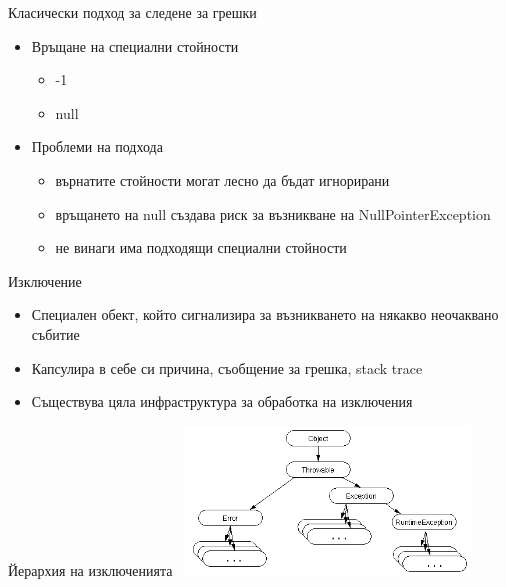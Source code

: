 \documentclass{beamer}
\begin{document}
\begin{frame}{Класически подход за следене за грешки}
  \transdissolve
  \begin{itemize}
  \item Връщане на специални стойности
    \begin{itemize}
      \item -1
      \item null
    \end{itemize}
  \item Проблеми на подхода
    \begin{itemize}
      \item върнатите стойности могат лесно да бъдат игнорирани
      \item връщането на null създава риск за възникване на
        NullPointerException
      \item не винаги има подходящи специални стойности
    \end{itemize}

  \end{itemize}
\end{frame}

\begin{frame}{Изключение}
  \transdissolve
  \begin{itemize}
  \item Специален обект, който сигнализира за възникването на някакво
    неочаквано събитие
  \item Капсулира в себе си причина, съобщение за грешка, stack trace
  \item Съществува цяла инфраструктура за обработка на изключения
  \end{itemize}
\end{frame}


\begin{frame}{Йерархия на изключенията}
  \transdissolve
  \includegraphics[height=150px,width=300px]{images/throwableHierarchy}
\end{frame}
\end{document}
